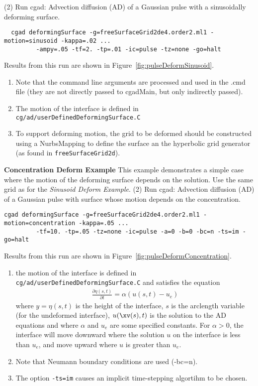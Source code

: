 \documentclass[11pt]{article}
\begin{document}
\noindent (2) Run cgad: Advection diffusion (AD) of a Gaussian pulse with a sinusoidally deforming surface. 
\begin{verbatim}
  cgad deformingSurface -g=freeSurfaceGrid2de4.order2.ml1 -motion=sinusoid -kappa=.02 ...
         -ampy=.05 -tf=2. -tp=.01 -ic=pulse -tz=none -go=halt
\end{verbatim}
Results from this run are shown in Figure~\ref{fig:pulseDeformSinusoid}.

\begin{enumerate}
  \item Note that the command line arguments are processed and used in the .cmd file (they are not directly passed
to cgadMain, but only indirectly passed). 
  \item The motion of the interface is defined in {\tt cg/ad/userDefinedDeformingSurface.C}
  \item To support deforming motion, the grid to be deformed should be constructed using a NurbsMapping to define
    the surface an the hyperbolic grid generator (as found in {\tt freeSurfaceGrid2d}).
\end{enumerate}



\noindent \textbf{Concentration Deform Example}
This example demonstrates a simple case where the motion of the deforming surface depends on the solution.
  Use the same grid as for the {\em  Sinusoid Deform Example}.
\noindent (2) Run cgad: Advection diffusion (AD) of a Gaussian pulse with surface whose motion depends 
  on the concentration.
\begin{verbatim}
cgad deformingSurface -g=freeSurfaceGrid2de4.order2.ml1 -motion=concentration -kappa=.05 ...
         -tf=10. -tp=.05 -tz=none -ic=pulse -a=0 -b=0 -bc=n -ts=im -go=halt
\end{verbatim}
Results from this run are shown in Figure~\ref{fig:pulseDeformConcentration}.

\begin{enumerate}
   \item the motion of the interface is defined in {\tt cg/ad/userDefinedDeformingSurface.C} and satisfies the equation
\begin{align*}
   \frac{\partial \eta(s,t)}{\partial t} = \alpha ( u(s,t) - u_e )  
\end{align*}
where $y=\eta(s,t)$ is the height of the interface, $s$ is the arclength variable (for the undeformed interface),
$u(\xv(s),t)$ is the solution to the AD equations and where $\alpha$ and $u_e$ are some specified constants.
For $\alpha>0$, the interface will move downward where the solution $u$ on the interface is less than $u_e$,
and move upward where $u$ is greater than $u_e$. 
  \item Note that Neumann boundary conditions are used (-bc=n). 
  \item The option {\tt -ts=im} causes an implicit time-stepping algortihm to be chosen.
\end{enumerate}
\end{document}
